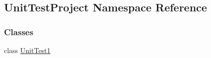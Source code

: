 \hypertarget{namespaceUnitTestProject}{}\subsection{Unit\+Test\+Project Namespace Reference}
\label{namespaceUnitTestProject}
\subsubsection*{Classes}
\begin{DoxyCompactItemize}
\item 
class \hyperlink{classUnitTestProject_1_1UnitTest1}{Unit\+Test1}
\end{DoxyCompactItemize}
